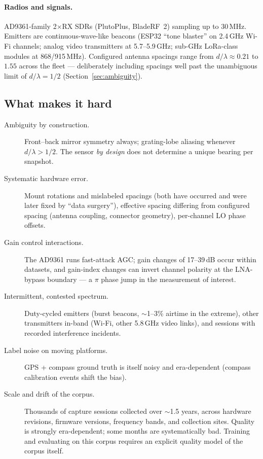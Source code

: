 \paragraph{Radios and signals.}
AD9361-family 2$\times$RX SDRs (PlutoPlus, BladeRF~2) sampling up to
30\,MHz. Emitters are continuous-wave-like beacons (ESP32 ``tone blaster'' on
2.4\,GHz Wi-Fi channels; analog video transmitters at 5.7--5.9\,GHz; sub-GHz
LoRa-class modules at 868/915\,MHz). Configured antenna spacings range from
$d/\lambda \approx 0.21$ to $1.55$ across the fleet --- deliberately including
spacings well past the unambiguous limit of $d/\lambda = 1/2$
(Section~\ref{sec:ambiguity}).

\subsection{What makes it hard}

\begin{description}
  \item[Ambiguity by construction.] Front--back mirror symmetry always;
    grating-lobe aliasing whenever $d/\lambda > 1/2$. The sensor
    \emph{by design} does not determine a unique bearing per snapshot.
  \item[Systematic hardware error.] Mount rotations and mislabeled spacings
    (both have occurred and were later fixed by ``data surgery''), effective
    spacing differing from configured spacing (antenna coupling, connector
    geometry), per-channel LO phase offsets.
  \item[Gain control interactions.] The AD9361 runs fast-attack AGC; gain
    changes of 17--39\,dB occur within datasets, and gain-index changes can
    invert channel polarity at the LNA-bypass boundary --- a $\pi$ phase jump
    in the measurement of interest.
  \item[Intermittent, contested spectrum.] Duty-cycled emitters (burst
    beacons, $\sim$1--3\% airtime in the extreme), other transmitters in-band
    (Wi-Fi, other 5.8\,GHz video links), and sessions with recorded
    interference incidents.
  \item[Label noise on moving platforms.] GPS + compass ground truth is
    itself noisy and era-dependent (compass calibration events shift the bias).
  \item[Scale and drift of the corpus.] Thousands of capture sessions
    collected over $\sim$1.5 years, across hardware revisions, firmware
    versions, frequency bands, and collection sites. Quality is strongly
    era-dependent; some months are systematically bad. Training and evaluating
    on this corpus requires an explicit quality model of the corpus itself.
\end{description}

